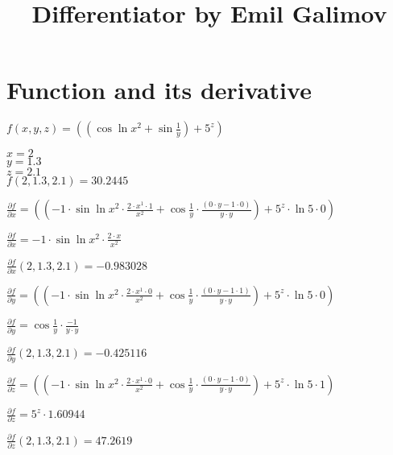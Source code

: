 \documentclass{article}
\title{Differentiator by Emil Galimov}
\begin{document}
\maketitle
\section{Function and its derivative}
\begin{center}
$f( x, y, z) = (( \cos{ \ln{x^{2}}}+ \sin{\frac{1}{y}})+5^{z})$\\
\end{center}
\begin{center}
$x = 2$\\ 
$y = 1.3$\\ 
$z = 2.1$\\ 
$f( 2, 1.3, 2.1) = 30.2445$
\end{center}
\begin{center}
$\frac{\partial f}{\partial x} = ((-1 \cdot  \sin{ \ln{x^{2}}} \cdot \frac{2 \cdot x^{1} \cdot 1}{x^{2}}+ \cos{\frac{1}{y}} \cdot \frac{(0 \cdot y-1 \cdot 0)}{y \cdot y})+5^{z} \cdot  \ln{5} \cdot 0)$\\
\end{center}
\begin{center}
$\frac{\partial f}{\partial x} = -1 \cdot  \sin{ \ln{x^{2}}} \cdot \frac{2 \cdot x}{x^{2}}$\\
\end{center}
\begin{center}
$\frac{\partial f}{\partial x}(2, 1.3, 2.1) = -0.983028$\\
\end{center}
\begin{center}
$\frac{\partial f}{\partial y} = ((-1 \cdot  \sin{ \ln{x^{2}}} \cdot \frac{2 \cdot x^{1} \cdot 0}{x^{2}}+ \cos{\frac{1}{y}} \cdot \frac{(0 \cdot y-1 \cdot 1)}{y \cdot y})+5^{z} \cdot  \ln{5} \cdot 0)$\\
\end{center}
\begin{center}
$\frac{\partial f}{\partial y} =  \cos{\frac{1}{y}} \cdot \frac{-1}{y \cdot y}$\\
\end{center}
\begin{center}
$\frac{\partial f}{\partial y}(2, 1.3, 2.1) = -0.425116$\\
\end{center}
\begin{center}
$\frac{\partial f}{\partial z} = ((-1 \cdot  \sin{ \ln{x^{2}}} \cdot \frac{2 \cdot x^{1} \cdot 0}{x^{2}}+ \cos{\frac{1}{y}} \cdot \frac{(0 \cdot y-1 \cdot 0)}{y \cdot y})+5^{z} \cdot  \ln{5} \cdot 1)$\\
\end{center}
\begin{center}
$\frac{\partial f}{\partial z} = 5^{z} \cdot 1.60944$\\
\end{center}
\begin{center}
$\frac{\partial f}{\partial z}(2, 1.3, 2.1) = 47.2619$\\
\end{center}
\end{document}
